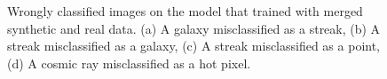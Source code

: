 \begin{figure}[!h]
    \caption[Wrongly classified images on the model that trained with merged synthetic and real data. ]
    {Wrongly classified images on the model that trained with merged synthetic and real data. (a) A galaxy misclassified as a streak, (b) A streak misclassified as a galaxy, (c) A streak misclassified as a point, (d) A cosmic ray misclassified as a hot pixel. }
    \label{fig:wrongmerged}
\end{figure}
